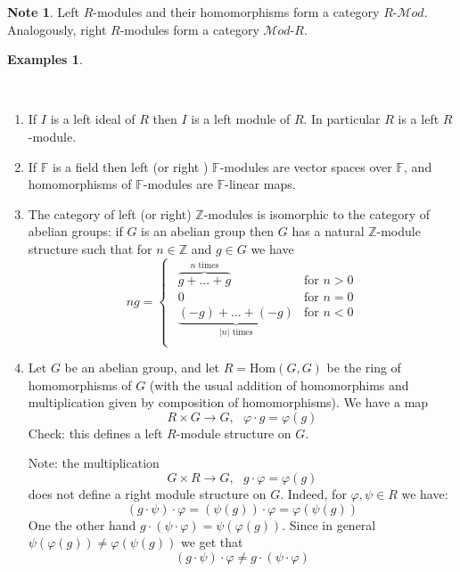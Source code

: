 \documentclass[12pt, letterpaper, oneside]{article}
\theoremstyle{plain}
\theoremstyle{definition}
\newtheorem{examples}[theorem]{Examples}
\newtheorem{note}[theorem]{Note}
\newcommand{\Z}{{\mathbb Z}}
\newcommand{\F}{{\mathbb F}}
\newcommand{\Hom}{\mathrm{Hom}}
\newcommand{\Mod}{{\mathcal Mod}}
\newcommand{\benu}{\begin{enumerate}}
\newcommand{\eenu}{\end{enumerate}}
\newcommand{\vs}{\vskip 5mm}
\newcommand{\isep}[1][0]{\setlength{\itemsep}{#1 mm}}
\begin{document}
\vs\vs

\begin{note} 
Left $R$-modules and their homomorphisms form a category $R$-$\Mod$. 
Analogously, right $R$-modules form a category $\Mod$-$R$. 
\end{note} 


\vs\vs


\begin{examples}\ 

\vskip -13mm

\ 
\benu
\isep[8]


\item If $I$ is a left ideal of $R$ then $I$ is a left module of $R$. In particular 
$R$ is a left $R$-module. 


\item If $\F$ is a field then left (or right ) $\F$-modules are vector spaces over $\F$, 
and homomorphisms of $\F$-modules are $\F$-linear maps. 


\item The category of left (or right) $\Z$-modules is isomorphic to the category of abelian groups:
if $G$ is an abelian group then $G$ has a natural $\Z$-module structure such that for $n\in \Z$ and 
$g\in G$ we have  
$$
ng = 
\begin{cases}
\ \ \overbrace{g+ \dots +g}^{\text{$n$ times}} & \text{for } n>0 \\[1mm]
\ \ 0 &  \text{for } n=0 \\[1mm]
\ \ \underbrace{(-g)+ \dots +(-g)}_{\text{$|n|$ times}} & \text{for } n<0 \\
\end{cases}
$$


\item Let $G$ be an abelian group, and let $R = \Hom(G, G)$ be the ring of homomorphisms 
of $G$ (with the usual addition of homomorphims and multiplication given by composition of 
homomorphisms). We have a map 
$$R\times G \to G, \ \ \ \varphi\cdot g = \varphi(g)$$ 
Check: this defines a left $R$-module structure on $G$. 

Note: the multiplication 
$$G\times R \to G, \ \ \ g\cdot \varphi = \varphi(g)$$  
does not define a right module structure on 
$G$. Indeed, for $\varphi, \psi\in R$ we have:
$$(g\cdot \psi)\cdot \varphi  = (\psi(g))\cdot \varphi = \varphi(\psi(g))$$
One the other hand $g\cdot (\psi \cdot \varphi) =  \psi(\varphi(g))$. Since in general 
$\psi(\varphi(g)) \neq \varphi(\psi(g))$ we get that 
$$(g\cdot \psi)\cdot \varphi  \neq g\cdot (\psi \cdot \varphi) $$

\eenu

\end{examples} 
\end{document}
